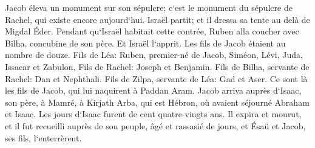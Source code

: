 \verse Jacob éleva un monument sur son sépulcre; c`est le monument du sépulcre de Rachel, qui existe encore aujourd`hui. 
\verse Israël partit; et il dressa sa tente au delà de Migdal Éder. 
\verse Pendant qu`Israël habitait cette contrée, Ruben alla coucher avec Bilha, concubine de son père. Et Israël l`apprit. Les fils de Jacob étaient au nombre de douze. 
\verse Fils de Léa: Ruben, premier-né de Jacob, Siméon, Lévi, Juda, Issacar et Zabulon. 
\verse Fils de Rachel: Joseph et Benjamin. 
\verse Fils de Bilha, servante de Rachel: Dan et Nephthali. 
\verse Fils de Zilpa, servante de Léa: Gad et Aser. Ce sont là les fils de Jacob, qui lui naquirent à Paddan Aram. 
\verse Jacob arriva auprès d`Isaac, son père, à Mamré, à Kirjath Arba, qui est Hébron, où avaient séjourné Abraham et Isaac. 
\verse Les jours d`Isaac furent de cent quatre-vingts ans. 
\verse Il expira et mourut, et il fut recueilli auprès de son peuple, âgé et rassasié de jours, et Ésaü et Jacob, ses fils, l`enterrèrent. 

